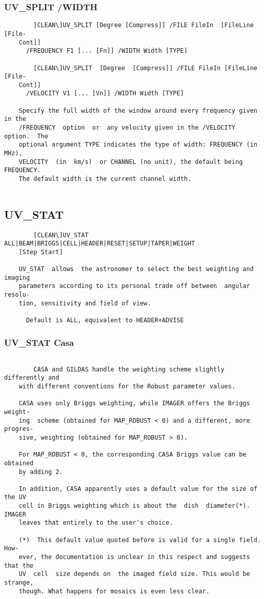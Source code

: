 \subsubsection{UV\_SPLIT /WIDTH}
\begin{verbatim}
        [CLEAN\]UV_SPLIT [Degree [Compress]] /FILE FileIn  [FileLine  [File-
    Cont]]
      /FREQUENCY F1 [... [Fn]] /WIDTH Width [TYPE]

        [CLEAN\]UV_SPLIT  [Degree  [Compress]] /FILE FileIn [FileLine [File-
    Cont]]
      /VELOCITY V1 [... [Vn]] /WIDTH Width [TYPE]

    Specify the full width of the window around every frequency given in the
    /FREQUENCY  option  or  any velocity given in the /VELOCITY option.  The
    optional argument TYPE indicates the type of width: FREQUENCY (in  MHz),
    VELOCITY  (in  km/s)  or CHANNEL (no unit), the default being FREQUENCY.
    The default width is the current channel width.


\end{verbatim}
\subsection{UV\_STAT}
\begin{verbatim}
        [CLEAN\]UV_STAT ALL|BEAM|BRIGGS|CELL|HEADER|RESET|SETUP|TAPER|WEIGHT
    [Step Start]

    UV_STAT  allows  the astronomer to select the best weighting and imaging
    parameters according to its personal trade off between  angular  resolu-
    tion, sensitivity and field of view.

      Default is ALL, equivalent to HEADER+ADVISE

\end{verbatim}
\subsubsection{UV\_STAT Casa}
\begin{verbatim}

        CASA and GILDAS handle the weighting scheme slightly differently and
    with different conventions for the Robust parameter values.

    CASA uses only Briggs weighting, while IMAGER offers the Briggs  weight-
    ing  scheme (obtained for MAP_ROBUST < 0) and a different, more progres-
    sive, weighting (obtained for MAP_ROBUST > 0).

    For MAP_ROBUST < 0, the corresponding CASA Briggs value can be  obtained
    by adding 2.

    In addition, CASA apparently uses a default value for the size of the UV
    cell in Briggs weighting which is about the  dish  diameter(*).   IMAGER
    leaves that entirely to the user's choice.

    (*)  This default value quoted before is valid for a single field.  How-
    ever, the documentation is unclear in this respect and suggests that the
    UV  cell  size depends on  the imaged field size. This would be strange,
    though. What happens for mosaics is even less clear.


\end{verbatim}
